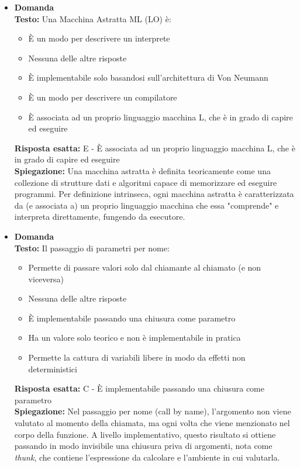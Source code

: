 \documentclass[12pt, a4paper]{article}
\newcounter{domandateoria}
\begin{document}
\begin{itemize}
    \item {}\textbf{Domanda \thedomandateoria} \\
    \textbf{Testo:} Una Macchina Astratta ML (LO) è:
    \begin{itemize}
        \item[A)] È un modo per descrivere un interprete
        \item[B)] Nessuna delle altre risposte
        \item[C)] È implementabile solo basandosi sull'architettura di Von Neumann
        \item[D)] È un modo per descrivere un compilatore
        \item[E)] È associata ad un proprio linguaggio macchina L, che è in grado di capire ed eseguire
    \end{itemize}
    \textbf{Risposta esatta:} E - È associata ad un proprio linguaggio macchina L, che è in grado di capire ed eseguire \\
    \textbf{Spiegazione:} Una macchina astratta è definita teoricamente come una collezione di strutture dati e algoritmi capace di memorizzare ed eseguire programmi. Per definizione intrinseca, ogni macchina astratta è caratterizzata da (e associata a) un proprio linguaggio macchina che essa "comprende" e interpreta direttamente, fungendo da esecutore.
    \vspace{0.3cm}

    \item {}\textbf{Domanda \thedomandateoria} \\
    \textbf{Testo:} Il passaggio di parametri per nome:
    \begin{itemize}
        \item[A)] Permette di passare valori solo dal chiamante al chiamato (e non viceversa)
        \item[B)] Nessuna delle altre risposte
        \item[C)] È implementabile passando una chiusura come parametro
        \item[D)] Ha un valore solo teorico e non è implementabile in pratica
        \item[E)] Permette la cattura di variabili libere in modo da effetti non deterministici
    \end{itemize}
    \textbf{Risposta esatta:} C - È implementabile passando una chiusura come parametro \\
    \textbf{Spiegazione:} Nel passaggio per nome (call by name), l'argomento non viene valutato al momento della chiamata, ma ogni volta che viene menzionato nel corpo della funzione. A livello implementativo, questo risultato si ottiene passando in modo invisibile una chiusura priva di argomenti, nota come \textit{thunk}, che contiene l'espressione da calcolare e l'ambiente in cui valutarla.
    \vspace{0.3cm}


\end{itemize}
\end{document}
